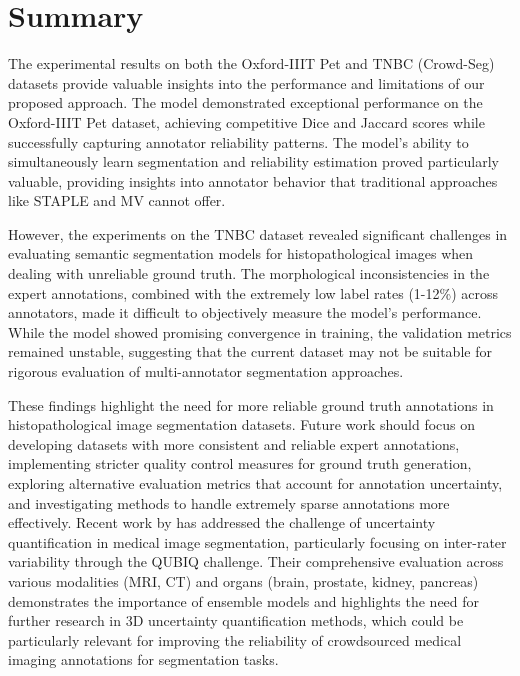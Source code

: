 \section{Summary}

The experimental results on both the Oxford-IIIT Pet and \gls{TNBC}
(Crowd-Seg) datasets provide valuable insights into the performance
and limitations of our proposed approach. The model demonstrated
exceptional performance on the Oxford-IIIT Pet dataset, achieving
competitive Dice and Jaccard scores while successfully capturing
annotator reliability patterns. The model's ability to simultaneously
learn segmentation and reliability estimation proved particularly
valuable, providing insights into annotator behavior that traditional
approaches like STAPLE and MV cannot offer.

However, the experiments on the \gls{TNBC} dataset revealed significant
challenges in evaluating semantic segmentation models for
histopathological images when dealing with unreliable ground truth.
The morphological inconsistencies in the expert annotations, combined
with the extremely low label rates (1-12\%) across annotators, made
it difficult to objectively measure the model's performance. While
the model showed promising convergence in training, the validation
metrics remained unstable, suggesting that the current dataset may
not be suitable for rigorous evaluation of multi-annotator
segmentation approaches.

These findings highlight the need for more reliable ground truth
annotations in histopathological image segmentation datasets. Future
work should focus on developing datasets with more consistent and reliable
expert annotations, implementing stricter quality control measures for ground
truth generation, exploring alternative evaluation metrics that account for
annotation uncertainty, and investigating methods to handle extremely sparse
annotations more effectively. Recent work by \cite{LiEtAl2024} has addressed
the challenge of uncertainty quantification in medical image segmentation,
particularly focusing on inter-rater variability through the QUBIQ challenge.
Their comprehensive evaluation across various modalities (MRI, CT) and organs
(brain, prostate, kidney, pancreas) demonstrates the importance of ensemble
models and highlights the need for further research in 3D uncertainty
quantification methods, which could be particularly relevant for improving
the reliability of crowdsourced medical imaging annotations for segmentation
tasks.


